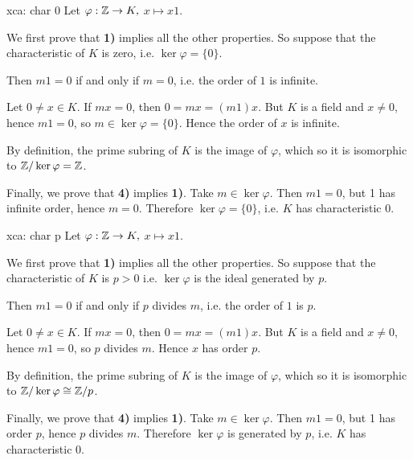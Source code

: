 \begin{sol}{xca: char 0}
Let $\varphi:\mathbb{Z}\to K,$ $x\mapsto x1$.

We first prove that \textbf{1)} implies all the other 
properties. So suppose that the characteristic of $K$ is zero, i.e. $\ker\varphi=\{0\}$. 

Then $m1=0$ if and only if $m=0$, i.e.
the order of $1$ is infinite.

Let $0\neq x\in K$. If $mx=0$, then $0=mx=(m1)x$.
But $K$ is a field and $x\neq 0$, hence $m1=0$,
so $m\in\ker\varphi=\{0\}$.
Hence the order of $x$ is infinite.

By definition, the prime subring of $K$ is
the image of $\varphi$, which 
so it is isomorphic to $\mathbb{Z}/\ker\varphi=\mathbb{Z}$.

Finally, we prove that \textbf{4)} implies \textbf{1)}.
Take $m\in\ker\varphi$. Then $m1=0$,
but 1 has infinite order, hence $m=0$.
Therefore $\ker\varphi=\{0\}$, 
i.e. $K$ has characteristic 0.
\end{sol}

\begin{sol}{xca: char p}
Let $\varphi:\mathbb{Z}\to K,$ $x\mapsto x1$.

We first prove that \textbf{1)} implies all the other 
properties. So suppose that the characteristic of $K$ is $p>0$ i.e. $\ker\varphi$ is the ideal generated by $p$. 

Then $m1=0$ if and only if $p$ divides $m$, i.e.
the order of $1$ is $p$.

Let $0\neq x\in K$. If $mx=0$, then $0=mx=(m1)x$.
But $K$ is a field and $x\neq 0$, hence $m1=0$,
so $p$ divides $m$.
Hence $x$ has order $p$.

By definition, the prime subring of $K$ is
the image of $\varphi$, which 
so it is isomorphic to $\mathbb{Z}/\ker\varphi\cong \mathbb{Z}/p$.

Finally, we prove that \textbf{4)} implies \textbf{1)}.
Take $m\in\ker\varphi$. Then $m1=0$,
but 1 has order $p$, hence $p$ divides $m$.
Therefore $\ker\varphi$ is generated by $p$, 
i.e. $K$ has characteristic 0.
\end{sol}

